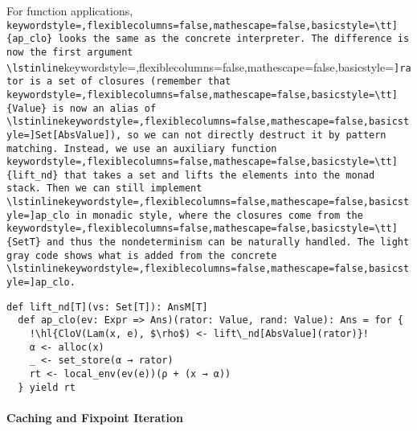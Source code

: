 For function applications, \lstinline[keywordstyle=,flexiblecolumns=false,mathescape=false,basicstyle=\tt]{ap_clo} looks the same as the concrete interpreter.
The difference is now the first argument \lstinline[keywordstyle=,flexiblecolumns=false,mathescape=false,basicstyle=\tt]{rator} is a set of closures (remember
that \lstinline[keywordstyle=,flexiblecolumns=false,mathescape=false,basicstyle=\tt]{Value} is now an alias of \lstinline[keywordstyle=,flexiblecolumns=false,mathescape=false,basicstyle=\tt]{Set[AbsValue]}), so we can not directly
destruct it by pattern matching. Instead, we use an auxiliary function \lstinline[keywordstyle=,flexiblecolumns=false,mathescape=false,basicstyle=\tt]{lift_nd}
that takes a set and lifts the elements into the monad stack. Then we can still
implement \lstinline[keywordstyle=,flexiblecolumns=false,mathescape=false,basicstyle=\tt]{ap_clo} in monadic style, where the closures come from the \lstinline[keywordstyle=,flexiblecolumns=false,mathescape=false,basicstyle=\tt]{SetT} and
thus the nondeterminism can be naturally handled. The light gray code shows what
is added from the concrete \lstinline[keywordstyle=,flexiblecolumns=false,mathescape=false,basicstyle=\tt]{ap_clo}.
\begin{lstlisting}[escapechar=!]
  def lift_nd[T](vs: Set[T]): AnsM[T]
  def ap_clo(ev: Expr => Ans)(rator: Value, rand: Value): Ans = for {
    !\hl{CloV(Lam(x, e), $\rho$) <- lift\_nd[AbsValue](rator)}!
    α <- alloc(x)
    _ <- set_store(α → rator)
    rt <- local_env(ev(e))(ρ + (x → α))
  } yield rt
\end{lstlisting}


\paragraph{Caching and Fixpoint Iteration}


